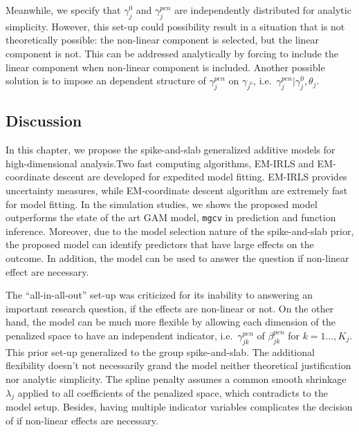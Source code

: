 \documentclass[AMA,STIX1COL,]{WileyNJD-v2}
\begin{document}
Meanwhile, we specify that \(\gamma_{j}^0\) and \(\gamma_{j}^{pen}\) are
independently distributed for analytic simplicity. However, this set-up
could possibility result in a situation that is not theoretically
possible: the non-linear component is selected, but the linear component
is not. This can be addressed analytically by forcing to include the
linear component when non-linear component is included. Another possible
solution is to impose an dependent structure of \(\gamma_{j}^{pen}\) on
\(\gamma_{j^{0}}\), i.e.~\(\gamma_j^{pen}|\gamma_{j}^{0}, \theta_j\).

\hypertarget{discussion-1}{%
\subsection{Discussion}\label{discussion-1}}

In this chapter, we propose the spike-and-slab generalized additive
models for high-dimensional analysis.Two fast computing algorithms,
EM-IRLS and EM-coordinate descent are developed for expedited model
fitting. EM-IRLS provides uncertainty measures, while EM-coordinate
descent algorithm are extremely fast for model fitting. In the
simulation studies, we shows the proposed model outperforms the state of
the art GAM model, \texttt{mgcv} in prediction and function inference.
Moreover, due to the model selection nature of the spike-and-slab prior,
the proposed model can identify predictors that have large effects on
the outcome. In addition, the model can be used to answer the question
if non-linear effect are necessary.

The ``all-in-all-out'' set-up was criticized for its inability to
answering an important research question, if the effects are non-linear
or not. On the other hand, the model can be much more flexible by
allowing each dimension of the penalized space to have an independent
indicator, i.e.~\(\gamma^{pen}_{jk}\) of \(\beta^{pen}_{jk}\) for
\(k = 1\dots, K_j\). This prior set-up generalized to the group
spike-and-slab. The additional flexibility doesn't not necessarily grand
the model neither theoretical justification nor analytic simplicity. The
spline penalty assumes a common smooth shrinkage \(\lambda_j\) applied
to all coefficients of the penalized space, which contradicts to the
model setup. Besides, having multiple indicator variables complicates
the decision of if non-linear effects are necessary.
\end{document}
